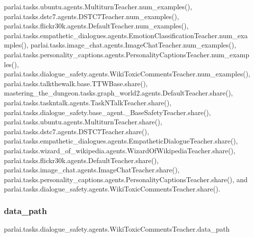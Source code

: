 parlai.\+tasks.\+ubuntu.\+agents.\+Multiturn\+Teacher.\+num\+\_\+examples(), parlai.\+tasks.\+dstc7.\+agents.\+D\+S\+T\+C7\+Teacher.\+num\+\_\+examples(), parlai.\+tasks.\+flickr30k.\+agents.\+Default\+Teacher.\+num\+\_\+examples(), parlai.\+tasks.\+empathetic\+\_\+dialogues.\+agents.\+Emotion\+Classification\+Teacher.\+num\+\_\+examples(), parlai.\+tasks.\+image\+\_\+chat.\+agents.\+Image\+Chat\+Teacher.\+num\+\_\+examples(), parlai.\+tasks.\+personality\+\_\+captions.\+agents.\+Personality\+Captions\+Teacher.\+num\+\_\+examples(), parlai.\+tasks.\+dialogue\+\_\+safety.\+agents.\+Wiki\+Toxic\+Comments\+Teacher.\+num\+\_\+examples(), parlai.\+tasks.\+talkthewalk.\+base.\+T\+T\+W\+Base.\+share(), mastering\+\_\+the\+\_\+dungeon.\+tasks.\+graph\+\_\+world2.\+agents.\+Default\+Teacher.\+share(), parlai.\+tasks.\+taskntalk.\+agents.\+Task\+N\+Talk\+Teacher.\+share(), parlai.\+tasks.\+dialogue\+\_\+safety.\+base\+\_\+agent.\+\_\+\+Base\+Safety\+Teacher.\+share(), parlai.\+tasks.\+ubuntu.\+agents.\+Multiturn\+Teacher.\+share(), parlai.\+tasks.\+dstc7.\+agents.\+D\+S\+T\+C7\+Teacher.\+share(), parlai.\+tasks.\+empathetic\+\_\+dialogues.\+agents.\+Empathetic\+Dialogue\+Teacher.\+share(), parlai.\+tasks.\+wizard\+\_\+of\+\_\+wikipedia.\+agents.\+Wizard\+Of\+Wikipedia\+Teacher.\+share(), parlai.\+tasks.\+flickr30k.\+agents.\+Default\+Teacher.\+share(), parlai.\+tasks.\+image\+\_\+chat.\+agents.\+Image\+Chat\+Teacher.\+share(), parlai.\+tasks.\+personality\+\_\+captions.\+agents.\+Personality\+Captions\+Teacher.\+share(), and parlai.\+tasks.\+dialogue\+\_\+safety.\+agents.\+Wiki\+Toxic\+Comments\+Teacher.\+share().

\mbox{\label{classparlai_1_1tasks_1_1dialogue__safety_1_1agents_1_1WikiToxicCommentsTeacher_a004f00e27fe4d6f437edab31e99018f5}} 
\subsubsection{\texorpdfstring{data\+\_\+path}{data\_path}}
{\footnotesize\ttfamily parlai.\+tasks.\+dialogue\+\_\+safety.\+agents.\+Wiki\+Toxic\+Comments\+Teacher.\+data\+\_\+path}



